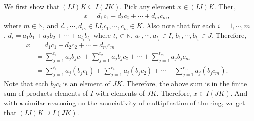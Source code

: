\documentclass[12pt]{article}
\begin{document}
\begin{fproof}[Jacobson 2.5.2]
  We first show that \((IJ)K \subseteq I(JK)\).
  Pick any element \(x \in (IJ)K\).
  Then,
  \begin{align*}
    x = d_1c_1 + d_2c_2 + \cdots + d_{m}c_{m},
  \end{align*}
  where \(m \in \mathbb{N}\), and \(d_1, \cdots, d_{m} \in IJ\),\( c_1, \cdots, c_{m} \in K\).
  Also note that for each \(i = 1, \cdots, m\).
  \(d_i = a_1b_1 + a_2b_2 + \cdots + a_{t_i}b_{t_i}\) where \(t_i \in \mathbb{N}\), \(a_1, \cdots, a_{t_i} \in I\), \(b_1, \cdots, b_{t_i} \in J\).
  Therefore,
  \begin{align*}
    x &= d_1c_1 + d_2c_2 + \cdots + d_{m}c_{m}\\
    &= \sum_{j=1}^{t_1} a_jb_jc_1 + \sum_{j=1}^{t_2} a_jb_jc_2 + \cdots + \sum_{j=1}^{t_m} a_jb_jc_m\\
    &= \sum_{j=1}^{t_1} a_j(b_jc_1) + \sum_{j=1}^{t_2} a_j(b_jc_2) + \cdots + \sum_{j=1}^{t_m} a_j(b_jc_m).
  \end{align*}
  Note that each \(b_jc_i\) is an element of \(JK\).
  Therefore, the above sum is in the finite sum of products elements of \(I\) with elements of \(JK\).
  Therefore, \(x \in I(JK)\).
  And with a similar reasoning on the associativity of multiplication of the ring, we get that \((IJ)K \supseteq I(JK)\).
\end{fproof}
\newpage
\end{document}
